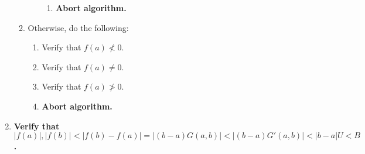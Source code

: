 \documentclass[twocolumn]{article}
\begin{document}
\begin{enumerate}
\begin{enumerate}
\begin{enumerate}
\begin{enumerate}
							\item \textbf{Abort algorithm.}
						\end{enumerate}
					\end{enumerate}
					\item Otherwise, do the following:
					\begin{enumerate}
						\item Verify that $f(a)\nless 0$.
						\item Verify that $f(a)\ne 0$.
						\item Verify that $f(a)\ngtr 0$.
						\item \textbf{Abort algorithm.}
					\end{enumerate}
				\end{enumerate}
				\item \textbf{Verify that $\lvert f(a)\rvert,\lvert f(b)\rvert<\lvert f(b)-f(a)\rvert=\lvert(b-a)G(a,b)\rvert<\lvert(b-a)G'(a,b)\rvert<\lvert b-a\rvert U<B$.}
			\end{enumerate}
\end{document}

